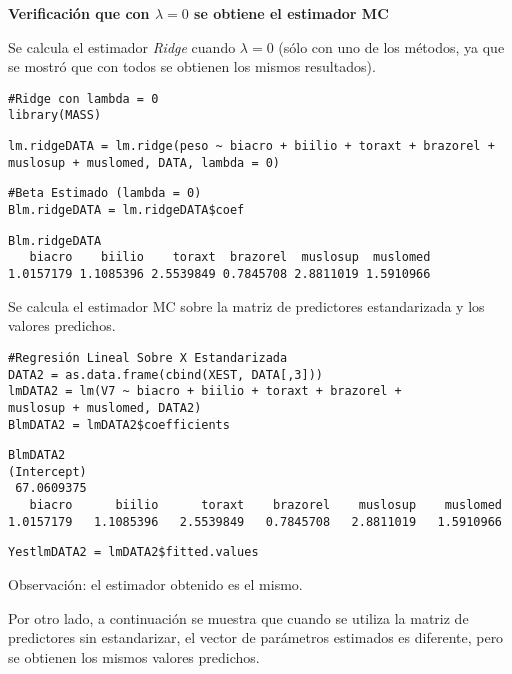\documentclass[a4paper,12pt]{report}
\begin{document}
{\large\textbf{Verificación que con $\lambda=0$ se obtiene el estimador MC}}

Se calcula el estimador \textit{Ridge} cuando $\lambda=0$ (sólo con uno de los métodos, ya que se mostró que con todos se obtienen los mismos resultados).

\texttt{\#Ridge con lambda = 0}\\
\texttt{library(MASS)}

{
\begin{verbatim}
lm.ridgeDATA = lm.ridge(peso ~ biacro + biilio + toraxt + brazorel + 
muslosup + muslomed, DATA, lambda = 0)
\end{verbatim}
}

\texttt{\#Beta Estimado (lambda = 0)}\\
\texttt{Blm.ridgeDATA = lm.ridgeDATA\$coef}

{
\begin{verbatim}
Blm.ridgeDATA
   biacro    biilio    toraxt  brazorel  muslosup  muslomed 
1.0157179 1.1085396 2.5539849 0.7845708 2.8811019 1.5910966 
\end{verbatim}
}

Se calcula el estimador MC sobre la matriz de predictores estandarizada y los valores predichos.

{
\begin{verbatim}
#Regresión Lineal Sobre X Estandarizada
DATA2 = as.data.frame(cbind(XEST, DATA[,3]))
lmDATA2 = lm(V7 ~ biacro + biilio + toraxt + brazorel + 
muslosup + muslomed, DATA2)
BlmDATA2 = lmDATA2$coefficients
\end{verbatim}
}

{
\begin{verbatim}
BlmDATA2 
(Intercept)     
 67.0609375 
   biacro      biilio      toraxt    brazorel    muslosup    muslomed 
1.0157179   1.1085396   2.5539849   0.7845708   2.8811019   1.5910966 
\end{verbatim}
}

{
\begin{verbatim}
YestlmDATA2 = lmDATA2$fitted.values
\end{verbatim}
}

Observación: el estimador obtenido es el mismo.

\newpage

Por otro lado, a continuación se muestra que cuando se utiliza la matriz de predictores sin estandarizar, el vector de parámetros estimados es diferente, pero se obtienen los mismos valores predichos.
\end{document}
